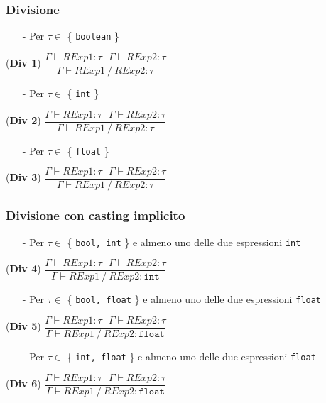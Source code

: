 \documentclass[12pt]{article}
\begin{document}
\subsubsection*{Divisione}
\begin{center}

\begin{itemize}
\item[-] Per $\tau \in$ \{ \texttt{boolean} \}
\end{itemize}
\noindent(\textbf{Div 1})
$\dfrac{\Gamma \vdash RExp1:\tau\ \ \ \Gamma \vdash RExp2:\tau}{\Gamma \vdash RExp1\ \texttt{/}\ RExp2:\tau}$\\[0.1in]

\begin{itemize}
\item[-] Per $\tau \in$ \{ \texttt{int} \}
\end{itemize}
\noindent(\textbf{Div 2})
$\dfrac{\Gamma \vdash RExp1:\tau\ \ \ \Gamma \vdash RExp2:\tau}{\Gamma \vdash RExp1\ \texttt{/}\ RExp2:\tau}$\\[0.1in]

\begin{itemize}
\item[-] Per $\tau \in$ \{ \texttt{float} \}
\end{itemize}
\noindent(\textbf{Div 3})
$\dfrac{\Gamma \vdash RExp1:\tau\ \ \ \Gamma \vdash RExp2:\tau}{\Gamma \vdash RExp1\ \texttt{/}\ RExp2:\tau}$\\[0.1in]
\end{center}

\subsubsection*{Divisione con casting implicito}

\begin{center}
\begin{itemize}
\item[-] Per $\tau \in$ \{ \texttt{bool, int} \} e almeno uno delle due espressioni \texttt{int}
\end{itemize}
\noindent(\textbf{Div 4})
$\dfrac{\Gamma \vdash RExp1:\tau\ \ \ \Gamma \vdash RExp2:\tau}{\Gamma \vdash RExp1\ \texttt{/}\ RExp2:\texttt{int}}$\\[0.1in]
\begin{itemize}
\item[-] Per $\tau \in$ \{ \texttt{bool, float} \} e almeno uno delle due espressioni \texttt{float}
\end{itemize}

\noindent(\textbf{Div 5})
$\dfrac{\Gamma \vdash RExp1:\tau\ \ \ \Gamma \vdash RExp2:\tau}{\Gamma \vdash RExp1\ \texttt{/}\ RExp2:\texttt{float}}$\\[0.1in]
\begin{itemize}
\item[-] Per $\tau \in$ \{ \texttt{int, float} \} e almeno uno delle due espressioni \texttt{float}
\end{itemize}
\noindent(\textbf{Div 6})
$\dfrac{\Gamma \vdash RExp1:\tau\ \ \ \Gamma \vdash RExp2:\tau}{\Gamma \vdash RExp1\ \texttt{/}\ RExp2:\texttt{float}}$
\end{center}
\end{document}
